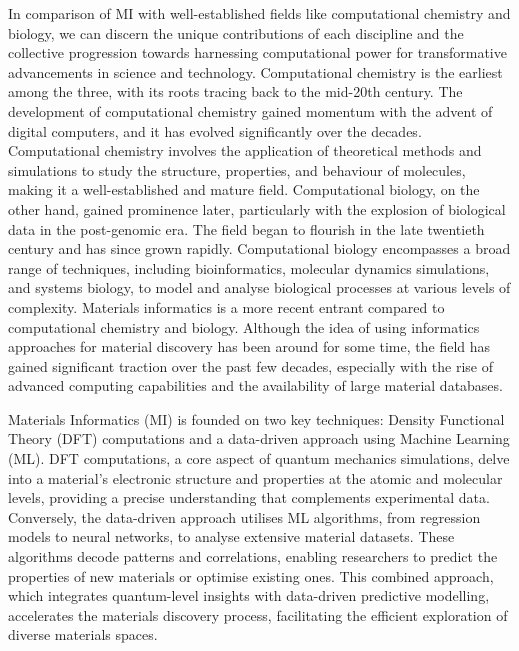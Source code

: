 In comparison of MI with well-established fields like computational chemistry and biology, we can discern the unique contributions of each discipline and the collective progression towards harnessing computational power for transformative advancements in science and technology.
Computational chemistry is the earliest among the three, with its roots tracing back to the mid-20th century. The development of computational chemistry gained momentum with the advent of digital computers, and it has evolved significantly over the decades. Computational chemistry involves the application of theoretical methods and simulations to study the structure, properties, and behaviour of molecules, making it a well-established and mature field.
Computational biology, on the other hand, gained prominence later, particularly with the explosion of biological data in the post-genomic era. The field began to flourish in the late twentieth century and has since grown rapidly. Computational biology encompasses a broad range of techniques, including bioinformatics, molecular dynamics simulations, and systems biology, to model and analyse biological processes at various levels of complexity.
Materials informatics is a more recent entrant compared to computational chemistry and biology. Although the idea of using informatics approaches for material discovery has been around for some time, the field has gained significant traction over the past few decades, especially with the rise of advanced computing capabilities and the availability of large material databases. 

Materials Informatics (MI) is founded on two key techniques: Density Functional Theory (DFT) computations and a data-driven approach using Machine Learning (ML). DFT computations, a core aspect of quantum mechanics simulations, delve into a material's electronic structure and properties at the atomic and molecular levels, providing a precise understanding that complements experimental data. Conversely, the data-driven approach utilises ML algorithms, from regression models to neural networks, to analyse extensive material datasets. 
These algorithms decode patterns and correlations, enabling researchers to predict the properties of new materials or optimise existing ones. 
This combined approach, which integrates quantum-level insights with data-driven predictive modelling, accelerates the materials discovery process, facilitating the efficient exploration of diverse materials spaces.

